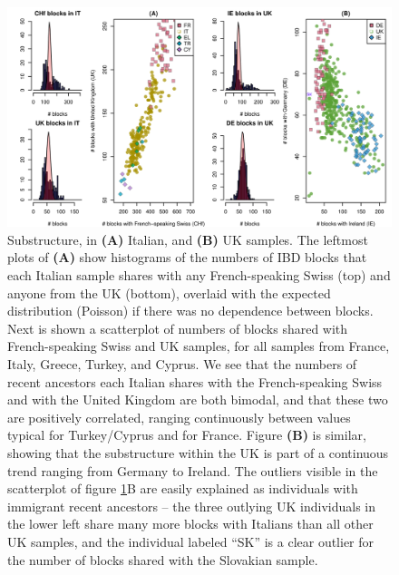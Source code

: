 \documentclass{article}
\begin{document}
\begin{figure}[!htp]
  \begin{center}
    \includegraphics{various-substructure}
    \caption{
    Substructure, in {\bf (A)} Italian, and {\bf (B)} UK samples.
    The leftmost plots of {\bf (A)} show histograms of the numbers of IBD blocks 
    that each Italian sample shares with any French-speaking Swiss (top) and anyone from the UK (bottom),
    overlaid with the expected distribution (Poisson) if there was no dependence between blocks. 
    Next is shown a scatterplot of numbers of blocks shared with French-speaking Swiss and UK samples,
    for all samples from France, Italy, Greece, Turkey, and Cyprus.
    We see that the numbers of recent ancestors each Italian shares with the French-speaking Swiss and with the United Kingdom are both bimodal,
    and that these two are positively correlated, ranging continuously between values typical for Turkey/Cyprus and for France.
    Figure {\bf (B)} is similar, showing that
    the substructure within the UK is part of a continuous trend ranging from Germany to Ireland.
    The outliers visible in the scatterplot of figure \ref{fig:substructure}B are easily explained as individuals with immigrant recent ancestors
    -- the three outlying UK individuals in the lower left share many more blocks with Italians than all other UK samples,
    and the individual labeled ``SK'' is a clear outlier for the number of blocks shared with the Slovakian sample.
    \label{fig:substructure}
    }
  \end{center}
\end{figure}
\end{document}
